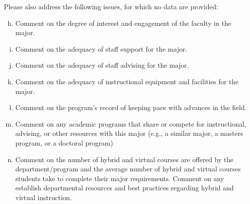 \documentclass[12pt]{article}
\begin{document}
\noindent
Please also address the following issues, for which no data are provided:\\
\begin{enumerate}[a)]
 \setcounter{enumi}{7}
 \item Comment on the degree of interest and engagement of the faculty in the major.
 \item Comment on the adequacy of staff support for the major.
 \item Comment on the adequacy of staff advising for the major.
 \item Comment on the adequacy of instructional equipment and facilities for the major.
 \item Comment on the program’s record of keeping pace with advances in the field.
 \item Comment on any academic programs that share or compete for instructional, advising, or other resources with this major (e.g., a similar major, a masters program, or a doctoral program)
 \item Comment on the number of hybrid and virtual courses are offered by the department/program and the average number of hybrid and virtual courses students take to complete their major requirements. Comment on any establish departmental resources and best practices regarding hybrid and virtual instruction.
\end{enumerate}
\end{document}
